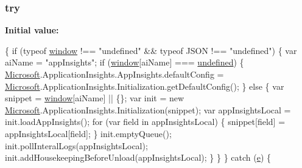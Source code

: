 \subsubsection[{\texorpdfstring{try}{try}}]{\setlength{\rightskip}{0pt plus 5cm}try}\hypertarget{obj_2_release_2_package_2_package_tmp_2_scripts_2ai_80_822_89-build00167_8js_abe4cc9788f52e49485473dc699537388}{}\label{obj_2_release_2_package_2_package_tmp_2_scripts_2ai_80_822_89-build00167_8js_abe4cc9788f52e49485473dc699537388}
{\bfseries Initial value\+:}
\begin{DoxyCode}
\{
            \textcolor{keywordflow}{if} (typeof \hyperlink{obj_2_release_2_package_2_package_tmp_2_scripts_2jquery-1_810_82_8js_a04a8a2bbfa9c15500892b8e5033d625b}{window} !== \textcolor{stringliteral}{"undefined"} && typeof JSON !== \textcolor{stringliteral}{"undefined"}) \{
                var aiName = \textcolor{stringliteral}{"appInsights"};
                \textcolor{keywordflow}{if} (\hyperlink{obj_2_release_2_package_2_package_tmp_2_scripts_2jquery-1_810_82_8js_a04a8a2bbfa9c15500892b8e5033d625b}{window}[aiName] === \hyperlink{obj_2_release_2_package_2_package_tmp_2_scripts_2jquery-1_810_82_8js_a08113a236cc18d2a9d5ce27e638012be}{undefined}) \{
                    \hyperlink{obj_2_release_2_package_2_package_tmp_2_scripts_2ai_80_822_89-build00167_8js_af7b21097393c8dc2ece8949358ff0e27}{Microsoft}.ApplicationInsights.AppInsights.defaultConfig = 
      \hyperlink{obj_2_release_2_package_2_package_tmp_2_scripts_2ai_80_822_89-build00167_8js_af7b21097393c8dc2ece8949358ff0e27}{Microsoft}.ApplicationInsights.Initialization.getDefaultConfig();
                \}
                \textcolor{keywordflow}{else} \{
                    var snippet = \hyperlink{obj_2_release_2_package_2_package_tmp_2_scripts_2jquery-1_810_82_8js_a04a8a2bbfa9c15500892b8e5033d625b}{window}[aiName] || \{\};
                    var init = \textcolor{keyword}{new} \hyperlink{obj_2_release_2_package_2_package_tmp_2_scripts_2ai_80_822_89-build00167_8js_af7b21097393c8dc2ece8949358ff0e27}{Microsoft}.ApplicationInsights.Initialization(snippet);
                    var appInsightsLocal = init.loadAppInsights();
                    \textcolor{keywordflow}{for} (var field in appInsightsLocal) \{
                        snippet[field] = appInsightsLocal[field];
                    \}
                    init.emptyQueue();
                    init.pollInteralLogs(appInsightsLocal);
                    init.addHousekeepingBeforeUnload(appInsightsLocal);
                \}
            \}
        \}
        \textcolor{keywordflow}{catch} (\hyperlink{obj_2_release_2_package_2_package_tmp_2_scripts_2jquery-1_810_82_8min_8js_a2c038346d47955cbe2cb91e338edd7e1}{e}) \{

\end{DoxyCode}
